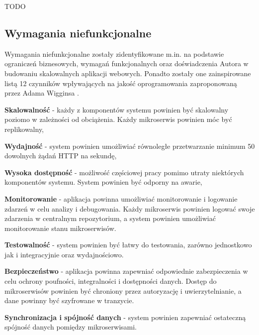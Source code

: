 TODO

\subsection{Wymagania niefunkcjonalne}

Wymagania niefunkcjonalne zostały zidentyfikowane m.in. na podstawie ograniczeń biznesowych, wymagań funkcjonalnych oraz doświadczenia Autora w budowaniu skalowalnych aplikacji webowych. Ponadto zostały one zainspirowane listą 12 czynników wpływających na jakość oprogramowania zaproponowaną przez Adama Wigginsa \cite{12factors}.

\textbf{Skalowalność} - każdy z komponentów systemu powinien być skalowalny poziomo w zależności od obciążenia. Każdy mikroserwis powinien móc być replikowalny,

\textbf{Wydajność} - system powinien umożliwiać równoległe przetwarzanie minimum 50 dowolnych żądań HTTP na sekundę,

\textbf{Wysoka dostępność} - możliwość częściowej pracy pomimo utraty niektórych komponentów systemu. System powinien być odporny na awarie,

\textbf{Monitorowanie} - aplikacja powinna umożliwiać monitorowanie i logowanie zdarzeń w celu analizy i debugowania. Każdy mikroserwis powinien logować swoje zdarzenia w centralnym repozytorium, a system powinien umożliwiać monitorowanie stanu mikroserwisów.

\textbf{Testowalność} - system powinien być łatwy do testowania, zarówno jednostkowo jak i integracyjnie oraz wydajnościowo.

\textbf{Bezpieczeństwo} - aplikacja powinna zapewniać odpowiednie zabezpieczenia w celu ochrony poufności, integralności i dostępności danych. Dostęp do mikroserwisów powinien być chroniony przez autoryzację i uwierzytelnianie, a dane powinny być szyfrowane w tranzycie.

\textbf{Synchronizacja i spójność danych} - system powinien zapewniać ostateczną spójność danych pomiędzy mikroserwisami.